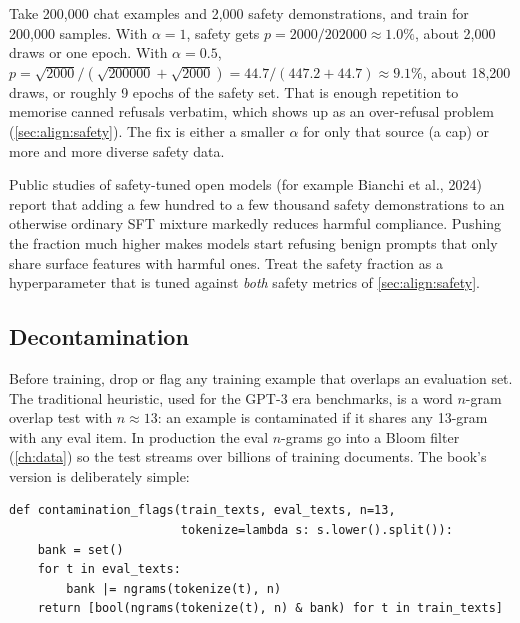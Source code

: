 \begin{napkinmath}
Take 200{,}000 chat examples and 2{,}000 safety demonstrations, and train for 200{,}000 samples.
With $\alpha=1$, safety gets $p=2000/202000\approx1.0\%$, about 2{,}000 draws or one epoch.
With $\alpha=0.5$, $p=\sqrt{2000}/(\sqrt{200000}+\sqrt{2000})=44.7/(447.2+44.7)\approx9.1\%$,
about 18{,}200 draws, or roughly 9 epochs of the safety set. That is enough repetition to
memorise canned refusals verbatim, which shows up as an over-refusal problem
(\cref{sec:align:safety}). The fix is either a smaller $\alpha$ for only that source (a cap) or
more and more diverse safety data.
\end{napkinmath}

\begin{keyidea}
Public studies of safety-tuned open models (for example Bianchi et al., 2024) report that
adding a few hundred to a few thousand safety demonstrations to an otherwise ordinary SFT
mixture markedly reduces harmful compliance. Pushing the fraction much higher makes models
start refusing benign prompts that only share surface features with harmful ones. Treat the
safety fraction as a hyperparameter that is tuned against \emph{both} safety metrics of
\cref{sec:align:safety}.
\end{keyidea}

\subsection{Decontamination}

Before training, drop or flag any training example that overlaps an evaluation set. The
traditional heuristic, used for the GPT-3 era benchmarks, is a word $n$-gram overlap test with
$n\approx13$: an example is contaminated if it shares any 13-gram with any eval item. In
production the eval $n$-grams go into a Bloom filter (\cref{ch:data}) so the test streams
over billions of training documents. The book's version is deliberately simple:

\begin{lstlisting}[caption={Flagging training texts that share an $n$-gram with an eval set.},label={lst:align:decon}]
def contamination_flags(train_texts, eval_texts, n=13,
                        tokenize=lambda s: s.lower().split()):
    bank = set()
    for t in eval_texts:
        bank |= ngrams(tokenize(t), n)
    return [bool(ngrams(tokenize(t), n) & bank) for t in train_texts]
\end{lstlisting}

